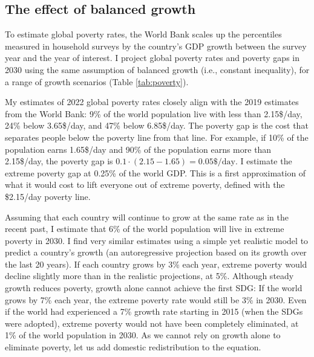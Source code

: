 \subsection{The effect of balanced growth}

To estimate global poverty rates, the World Bank scales up the percentiles measured in household surveys by the country's GDP growth between the survey year and the year of interest. I project global poverty rates and poverty gaps in 2030 using the same assumption of balanced growth (i.e., constant inequality), for a range of growth scenarios (Table \ref{tab:poverty}). 



My estimates of 2022 global poverty rates closely align with the 2019 estimates from the World Bank: 9\% of the world population live with less than 2.15\$/day, 24\% below 3.65\$/day, and 47\% below 6.85\$/day. 
The poverty gap is the cost that separates people below the poverty line from that line. For example, if 10\% of the population earns 1.65\$/day and 90\% of the population earns more than 2.15\$/day, the poverty gap is $0.1 \cdot (2.15 - 1.65) = 0.05\$/\text{day}$. 
I estimate the extreme poverty gap at 0.25\% of the world GDP. This is a first approximation of what it would cost to lift everyone out of extreme poverty, defined with the \$2.15/day poverty line. 

Assuming that each country will continue to grow at the same rate as in the recent past, %
I estimate that 6\% of the world population will live in extreme poverty in 2030. I find very similar estimates using a simple yet realistic model to predict a country's growth (an autoregressive projection based on its growth over the last 20 years). 
If each country grows by 3\% each year, extreme poverty would decline slightly more than in the realistic projections, at 5\%. 
Although steady growth reduces poverty, growth alone cannot achieve the first SDG: If the world grows by 7\% each year, the extreme poverty rate would still be 3\% in 2030. Even if the world had experienced a 7\% growth rate starting in 2015 (when the SDGs were adopted), extreme poverty would not have been completely eliminated, at 1\% of the world population in 2030. 
As we cannot rely on growth alone to eliminate poverty, let us add domestic redistribution to the equation.

